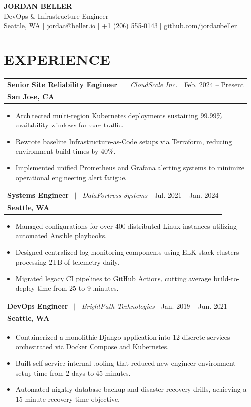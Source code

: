 \documentclass[10pt,letterpaper]{article}
\makeatletter
\newcommand{\job}[4]{
  \vspace{4pt}
  \begin{tabular*}{1.0\textwidth}[t]{l@{\extracolsep{\fill}}r}
    \textbf{\color{primary}#1} \ $|$ \ \textit{\color{secondary}#2} & \color{secondary}#4 \\
    \textbf{\color{secondary}\small #3} & \\
  \end{tabular*}\vspace{-4pt}
}
\makeatother
\begin{document}
{\Huge \textbf{\color{primary} JORDAN BELLER}} \\ \vspace{4pt}
{\color{secondary} DevOps \& Infrastructure Engineer} \\ \vspace{6pt}
\small \color{secondary} Seattle, WA $|$ \href{mailto:jordan@beller.io}{jordan@beller.io} $|$ +1 (206) 555-0143 $|$ \href{https://github.com/jordanbeller}{github.com/jordanbeller}

\section{EXPERIENCE}

\job{Senior Site Reliability Engineer}{CloudScale Inc.}{San Jose, CA}{Feb. 2024 -- Present}
\begin{itemize}[leftmargin=0.15in, topsep=2pt, itemsep=2pt]
    \item Architected multi-region Kubernetes deployments sustaining 99.99\% availability windows for core traffic.
    \item Rewrote baseline Infrastructure-as-Code setups via Terraform, reducing environment build times by 40\%.
    \item Implemented unified Prometheus and Grafana alerting systems to minimize operational engineering alert fatigue.
\end{itemize}

\job{Systems Engineer}{DataFortress Systems}{Seattle, WA}{Jul. 2021 -- Jan. 2024}
\begin{itemize}[leftmargin=0.15in, topsep=2pt, itemsep=2pt]
    \item Managed configurations for over 400 distributed Linux instances utilizing automated Ansible playbooks.
    \item Designed centralized log monitoring components using ELK stack clusters processing 2TB of telemetry daily.
    \item Migrated legacy CI pipelines to GitHub Actions, cutting average build-to-deploy time from 25 to 9 minutes.
\end{itemize}

\job{DevOps Engineer}{BrightPath Technologies}{Seattle, WA}{Jan. 2019 -- Jun. 2021}
\begin{itemize}[leftmargin=0.15in, topsep=2pt, itemsep=2pt]
    \item Containerized a monolithic Django application into 12 discrete services orchestrated via Docker Compose and Kubernetes.
    \item Built self-service internal tooling that reduced new-engineer environment setup time from 2 days to 45 minutes.
    \item Automated nightly database backup and disaster-recovery drills, achieving a 15-minute recovery time objective.
\end{itemize}
\end{document}
